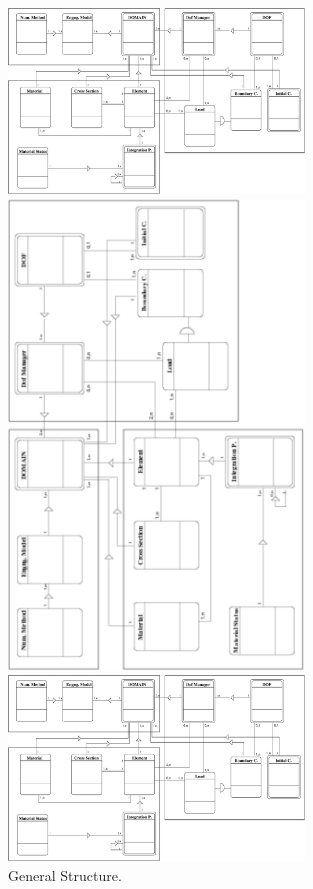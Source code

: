 \documentclass[a4paper]{article}
\begin{document}
\begin{figure}[tb]
\begin{htmlonly}
  \centerline{\includegraphics[width=0.7\textwidth]{general.eps}}
\end{htmlonly}
\ifpdf
\centerline{\includegraphics[width=0.7\textwidth]{general.pdf}}
\else
\centerline{\includegraphics[width=0.7\textwidth]{general.eps}}
\fi
\caption{General Structure.}
\label{genstructfig}
\end{figure}
\end{document}
